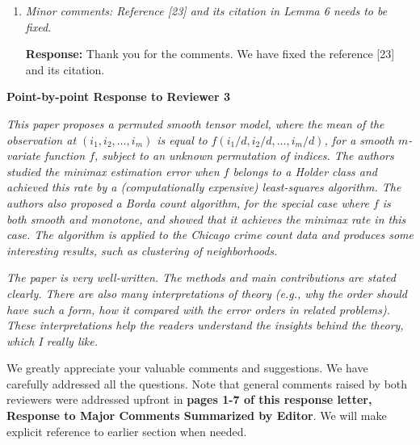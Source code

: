 \documentclass[11pt]{article}
\theoremstyle{plain}
\theoremstyle{definition}
\begin{document}
\begin{enumerate}[wide, labelwidth=!, labelindent=0pt]
    
    \item \textit{Minor comments: Reference [23] and its citation in Lemma 6 needs to be fixed.}
  
   \textbf{Response:} Thank you for the comments. We have fixed the reference [23] and its citation.
    
\end{enumerate}

\newpage

\begin{center}
    \textbf{Point-by-point Response to Reviewer 3}
\end{center}


\emph{This paper proposes a permuted smooth tensor model, where the mean of the observation at $(i_1,i_2,\ldots,i_m)$ is equal to $f(i_1/d, i_2/d,\ldots,i_m/d)$, for a smooth $m$-variate function $f$, subject to an unknown permutation of indices. The authors studied the minimax estimation error when $f$ belongs to a Holder class and achieved this rate by a (computationally expensive) least-squares algorithm. The authors also proposed a Borda count algorithm, for the special case where $f$ is both smooth and monotone, and showed that it achieves the minimax rate in this case. The algorithm is applied to the Chicago crime count data and produces some interesting results, such as clustering of neighborhoods.}

\emph{The paper is very well-written. The methods and main contributions are stated clearly. There are also many interpretations of theory (e.g., why the order should have such a form, how it compared with the error orders in related problems). These interpretations help the readers understand the insights behind the theory, which I really like.}


We greatly appreciate your valuable comments and suggestions. We have carefully addressed all the questions. Note that general comments raised by both reviewers were addressed upfront in {\bf pages 1-7 of this response letter, Response to Major Comments Summarized by Editor}. We will make explicit reference to earlier section when needed. 
\end{document}
